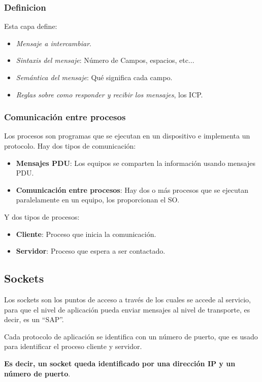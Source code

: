 \subsubsection{Definicion}
\noindent Esta capa define:
\begin{itemize}
        \item \textit{Mensaje a intercambiar}.
        \item \textit{Sintaxis del mensaje}: Número de Campos, espacios, etc...
        \item \textit{Semántica del mensaje}: Qué significa cada campo.
        \item \textit{Reglas sobre como responder y recibir los mensajes}, los ICP.
\end{itemize}
\subsubsection{Comunicación entre procesos}
\noindent Los procesos son programas que se ejecutan en un dispositivo e implementa un protocolo. Hay dos tipos de comunicación:
\begin{itemize}
        \item \textbf{Mensajes PDU}: Los equipos se comparten la información usando mensajes PDU.
        \item \textbf{Comunicación entre procesos}: Hay dos o más procesos que se ejecutan paralelamente en un equipo, los proporcionan el SO.
\end{itemize}
\noindent Y dos tipos de procesos:
\begin{itemize}
        \item \textbf{Cliente}: Proceso que inicia la comunicación.
        \item \textbf{Servidor}: Proceso que espera a ser contactado.
\end{itemize}
\subsection{Sockets}
\noindent Los sockets son los puntos de acceso a través de los cuales se accede al servicio, para que el nivel de aplicación pueda enviar mensajes al nivel de transporte, es decir, es un ``SAP''.
\par \vspace{.2cm }\noindent Cada protocolo de aplicación se identifica con un número de puerto, que es usado para identificar el proceso cliente y servidor.\par \noindent \textbf{Es decir, un socket queda identificado por una dirección IP y un número de puerto}.
